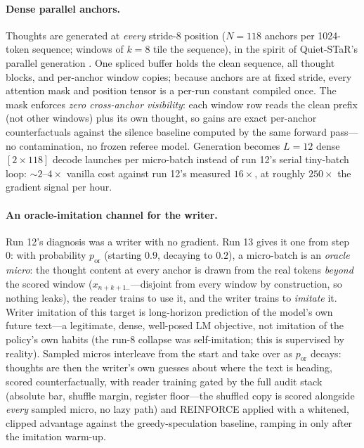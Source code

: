 \documentclass{article} %
\begin{document}
\paragraph{Dense parallel anchors.} Thoughts are generated at \emph{every} stride-8 position ($N{=}118$ anchors per 1024-token sequence; windows of $k{=}8$ tile the sequence), in the spirit of Quiet-STaR's parallel generation \citep{zelikman2024quietstar}. One spliced buffer holds the clean sequence, all thought blocks, and per-anchor window copies; because anchors are at fixed stride, every attention mask and position tensor is a per-run constant compiled once. The mask enforces \emph{zero cross-anchor visibility}: each window row reads the clean prefix (not other windows) plus its own thought, so gains are exact per-anchor counterfactuals against the silence baseline computed by the same forward pass---no contamination, no frozen referee model. Generation becomes $L{=}12$ dense $[2 \times 118]$ decode launches per micro-batch instead of run 12's serial tiny-batch loop: ${\sim}2$--$4\times$ vanilla cost against run 12's measured $16\times$, at roughly $250\times$ the gradient signal per hour.

\paragraph{An oracle-imitation channel for the writer.} Run 12's diagnosis was a writer with no gradient. Run 13 gives it one from step 0: with probability $p_{\mathrm{or}}$ (starting $0.9$, decaying to $0.2$), a micro-batch is an \emph{oracle micro}: the thought content at every anchor is drawn from the real tokens \emph{beyond} the scored window ($x_{n+k+1..}$---disjoint from every window by construction, so nothing leaks), the reader trains to use it, and the writer trains to \emph{imitate} it. Writer imitation of this target is long-horizon prediction of the model's own future text---a legitimate, dense, well-posed LM objective, not imitation of the policy's own habits (the run-8 collapse was self-imitation; this is supervised by reality). Sampled micros interleave from the start and take over as $p_{\mathrm{or}}$ decays: thoughts are then the writer's own guesses about where the text is heading, scored counterfactually, with reader training gated by the full audit stack (absolute bar, shuffle margin, register floor---the shuffled copy is scored alongside \emph{every} sampled micro, no lazy path) and REINFORCE applied with a whitened, clipped advantage against the greedy-speculation baseline, ramping in only after the imitation warm-up.
\end{document}
